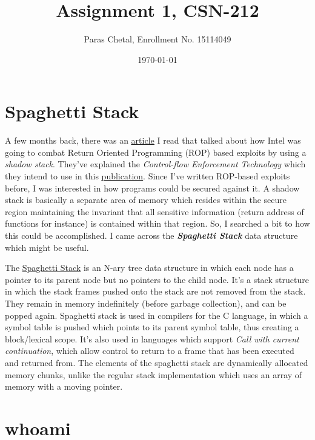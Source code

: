 \documentclass{article}
\title{\textbf{Assignment 1, CSN-212}}
\author{Paras Chetal, Enrollment No. 15114049}
\date{\today}
\begin{document}
\maketitle



\section{Spaghetti Stack}

A few months back, there was an \href{https://blogs.intel.com/evangelists/2016/06/09/intel-release-new-technology-specifications-protect-rop-attacks/}{\underline{article}} I read that talked about how Intel was going to combat Return Oriented Programming (ROP) based exploits by using a \textit{shadow stack}. They've explained the \textit{Control-flow Enforcement Technology} which they intend to use in this \href{https://software.intel.com/sites/default/files/managed/4d/2a/control-flow-enforcement-technology-preview.pdf}{\underline{publication}}. Since I've written ROP-based exploits before, I was interested in how programs could be secured against it. A shadow stack is basically a separate area of memory which resides within the secure region maintaining the invariant that all sensitive information (return address of functions for instance) is contained within that region. So, I searched a bit to how this could be accomplished. I came across the \textit{\textbf{Spaghetti Stack}} data structure which might be useful.

The \href{https://en.wikipedia.org/wiki/Parent\_pointer\_tree}{\underline{Spaghetti Stack}} is an N-ary tree data structure in which each node has a pointer to its parent node but no pointers to the child node. It's a stack structure in which the stack frames pushed onto the stack are not removed from the stack. They remain in memory indefinitely (before garbage collection), and can be popped again. Spaghetti stack is used in compilers for the C language, in which a symbol table is pushed which points to its parent symbol table, thus creating a block/lexical scope. It's also used in languages which support \textit{Call with current continuation}, which allow control to return to a frame that has been executed and returned from. The elements of the spaghetti stack are dynamically allocated memory chunks, unlike the regular stack implementation which uses an array of memory with a moving pointer.

\section{whoami}
\end{document}
